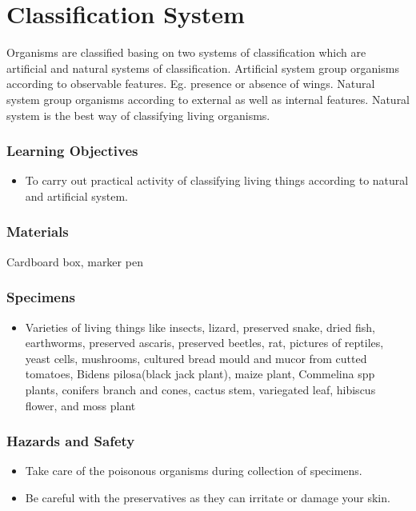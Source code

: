 \section{Classification System}
Organisms are classified basing on two systems of classification which are artificial and natural systems of classification. Artificial system group organisms according to observable features. Eg. presence or absence of wings. Natural system group organisms according to external as well as internal features. Natural system is the best way of classifying living organisms.

\subsubsection*{Learning Objectives}
\begin{itemize}
\item{To carry out practical activity of classifying living things according to natural and artificial system.}
\end{itemize}

\subsubsection*{Materials}
Cardboard box, marker pen

\subsubsection*{Specimens}
\begin{itemize}
\item{Varieties of living things like insects, lizard, preserved snake, dried fish, earthworms, preserved ascaris, preserved beetles, rat, pictures of reptiles, yeast cells, mushrooms, cultured bread mould and mucor from cutted tomatoes, Bidens pilosa(black jack plant), maize plant, Commelina spp plants, conifers branch and cones, cactus stem, variegated leaf, hibiscus flower, and moss plant}
\end{itemize}

\subsubsection*{Hazards and Safety}
\begin{itemize}
\item{Take care of the poisonous organisms during collection of specimens.}
\item{Be careful with the preservatives as they can irritate or damage your skin.}
\end{itemize}

